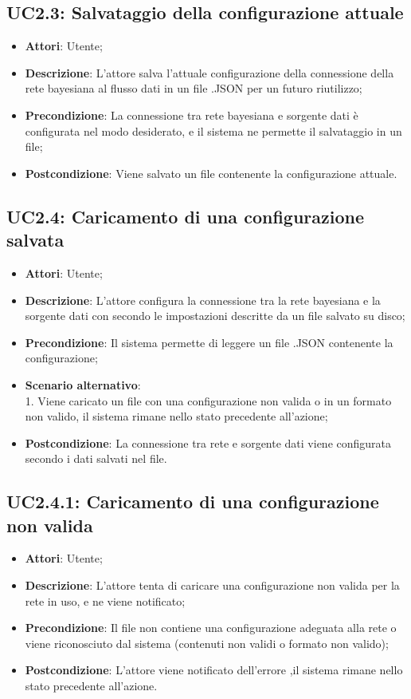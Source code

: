 \subsection{UC2.3: Salvataggio della configurazione attuale}

\hypertarget{UC2.3}{}
\begin{itemize}
	\item \textbf{Attori}: Utente;
	\item \textbf{Descrizione}: L'attore salva l'attuale configurazione della connessione della rete bayesiana al flusso dati in un file .JSON per un futuro riutilizzo;
	\item \textbf{Precondizione}: La connessione tra rete bayesiana e sorgente dati è configurata nel modo desiderato, e il sistema ne permette il salvataggio in un file;
	\item \textbf{Postcondizione}: Viene salvato un file contenente la configurazione attuale.
\end{itemize}

\subsection{UC2.4: Caricamento di una configurazione salvata}
\hypertarget{UC2.4}{}
\begin{itemize}
	\item \textbf{Attori}: Utente;
	\item \textbf{Descrizione}: L'attore configura la connessione tra la rete bayesiana e la sorgente dati con secondo le impostazioni descritte da un file salvato su disco;
	\item \textbf{Precondizione}: Il sistema permette di leggere un file .JSON contenente la configurazione;
	\item \textbf{Scenario alternativo}: \\
	1. Viene caricato un file con una configurazione non valida o in un formato non valido, il sistema rimane nello stato precedente all'azione;
	\item \textbf{Postcondizione}: La connessione tra rete e sorgente dati viene configurata secondo i dati salvati nel file.
\end{itemize}

\subsection{UC2.4.1: Caricamento di una configurazione non valida}
\hypertarget{UC2.4.1}{}
\begin{itemize}
	\item \textbf{Attori}: Utente;
	\item \textbf{Descrizione}: L'attore tenta di caricare una configurazione non valida per la rete in uso, e ne viene notificato;
	\item \textbf{Precondizione}: Il file non contiene una configurazione adeguata alla rete o viene riconosciuto dal sistema (contenuti non validi o formato non valido);
	\item \textbf{Postcondizione}: L'attore viene notificato dell'errore ,il sistema rimane nello stato precedente all'azione.
\end{itemize}

